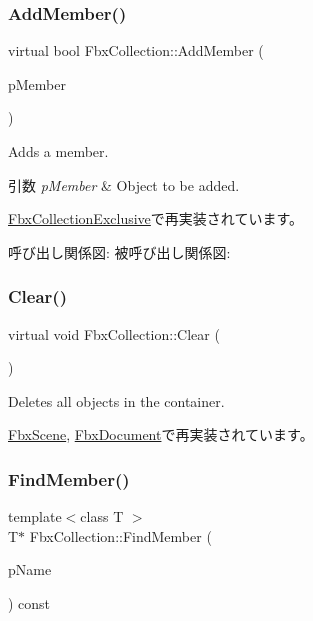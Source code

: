 \subsubsection{\texorpdfstring{Add\+Member()}{AddMember()}}
{\footnotesize\ttfamily virtual bool Fbx\+Collection\+::\+Add\+Member (\begin{DoxyParamCaption}\item[{\hyperlink{class_fbx_object}{Fbx\+Object} $\ast$}]{p\+Member }\end{DoxyParamCaption})\hspace{0.3cm}{\ttfamily [virtual]}}

Adds a member. 
\begin{DoxyParams}{引数}
{\em p\+Member} & Object to be added. \\
\hline
\end{DoxyParams}


\hyperlink{class_fbx_collection_exclusive_ab39aa1d3200f5cc628685d7c9eca6fb2}{Fbx\+Collection\+Exclusive}で再実装されています。

呼び出し関係図\+:
被呼び出し関係図\+:
\mbox{\label{class_fbx_collection_a79ba35ab4693cd1b1c79a221d7d2f8d3}} 
\subsubsection{\texorpdfstring{Clear()}{Clear()}}
{\footnotesize\ttfamily virtual void Fbx\+Collection\+::\+Clear (\begin{DoxyParamCaption}{ }\end{DoxyParamCaption})\hspace{0.3cm}{\ttfamily [virtual]}}



Deletes all objects in the container. 



\hyperlink{class_fbx_scene_ab578ff733eb8f6af89ff1645852966cd}{Fbx\+Scene}, \hyperlink{class_fbx_document_ac8fa73e98a73c4f6637466e58d069bbe}{Fbx\+Document}で再実装されています。

\mbox{\label{class_fbx_collection_ac68aa37ee6d89cb3cc066ca1407cb505}} 
\subsubsection{\texorpdfstring{Find\+Member()}{FindMember()}\hspace{0.1cm}{\footnotesize\ttfamily [1/2]}}
{\footnotesize\ttfamily template$<$class T $>$ \\
T$\ast$ Fbx\+Collection\+::\+Find\+Member (\begin{DoxyParamCaption}\item[{const char $\ast$}]{p\+Name }\end{DoxyParamCaption}) const}

